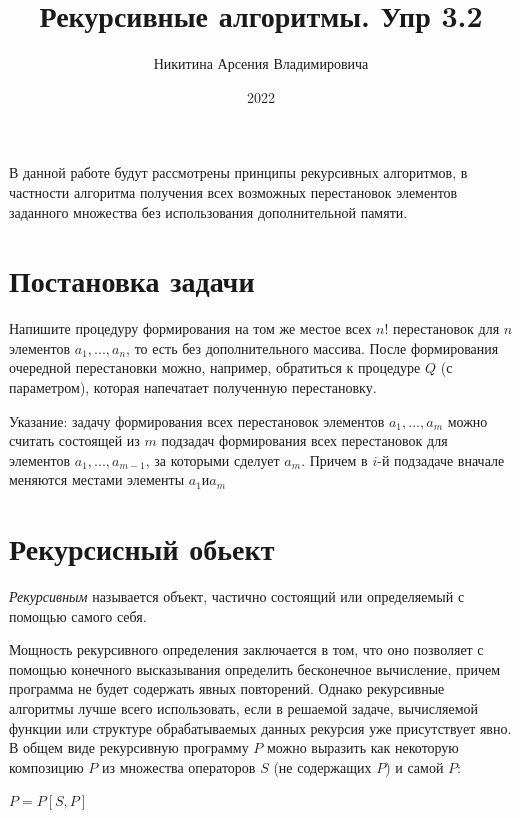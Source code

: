 \documentclass[bachelor, och, labwork]{shiza}
\begin{document}

\title{Рекурсивные алгоритмы. Упр 3.2}





\author{Никитина Арсения Владимировича}



\date{2022}

\maketitle

\tableofcontents

\intro
В данной работе будут рассмотрены принципы рекурсивных алгоритмов, в частности
алгоритма получения всех возможных перестановок элементов заданного множества
без использования дополнительной памяти.

\section{Постановка задачи}
Напишите процедуру формирования на том же местое всех $n!$ перестановок для $n$
элементов $a_1,...,a_n$, то есть без дополнительного массива. После формирования
очередной перестановки можно, например, обратиться к процедуре $Q$ (с параметром),
которая напечатает полученную перестановку.

Указание: задачу формирования всех перестановок элементов $a_1,...,a_m$ можно
считать состоящей из $m$ подзадач формирования всех перестановок для элементов
$a_1,...,a_{m-1}$, за которыми сделует $a_m$. Причем в $i$-й подзадаче вначале
меняются местами элементы $a_1 \text{и} a_m$

\section{Рекурсисный обьект}

\textit{Рекурсивным} называется объект, частично состоящий или определяемый с
помощью самого себя.

Мощность рекурсивного определения заключается в том, что оно позволяет с помощью
конечного высказывания определить бесконечное вычисление, причем программа не 
будет содержать явных повторений. Однако рекурсивные алгоритмы лучше всего
использовать, если в решаемой задаче, вычисляемой функции или структуре
обрабатываемых данных рекурсия уже присутствует явно. В общем виде рекурсивную
программу $P$ можно выразить как некоторую композицию $P$ из множества
операторов $S$ (не содержащих $P$) и самой $P$:
\begin{center}$P=P[S,P]$\end{center}
\end{document}
